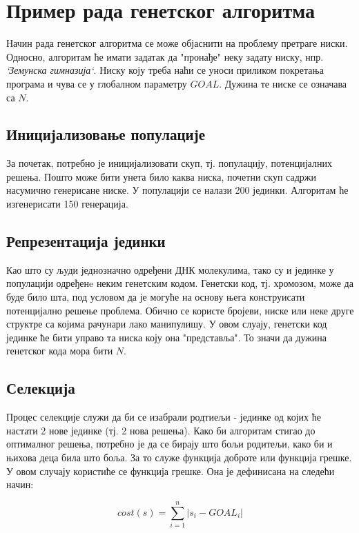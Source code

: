 \documentclass{article}
\begin{document}
\section{Пример рада генетског алгоритма}

Начин рада генетског алгоритма се може објаснити на проблему претраге ниски. Односно,
алгоритам ће имати задатак да "пронађе" неку задату ниску, нпр. \textit{`Земунска гимназија`}.
Ниску коју треба наћи се уноси приликом покретања програма и чува се у глобалном
параметру $GOAL$. Дужина те ниске се означава са $N$.

\subsection{Иницијализовање популације}
За почетак, потребно је иницијализовати скуп, тј. популацију, потенцијалних решења.
Пошто може бити унета било каква ниска, почетни скуп садржи насумично генерисане ниске.
У популацији се налази 200 јединки. Алгоритам ће изгенерисати 150 генерација. 

\subsection{Репрезентација јединки}
Као што су људи једнозначно одређени ДНК молекулима, тако су и јединке у популацији
одређенe неким генетским кодом. Генетски код, тј. хромозом, може да буде било шта, под условом да
је могуће на основу њега конструисати потенцијално решење проблема. Обично се користе бројеви, ниске или неке друге 
структре са којима рачунари лако манипулишу. У овом слуају, генетски код јединке
ће бити управо та ниска коју она "представља". То значи да дужина генетског кода мора бити $N$.

\subsection{Селекција}
Процес селекције служи да би се изабрали родтиељи - јединке од којих ће настати 2 нове 
јединке (тј. 2 нова решења). Како би алгоритам стигао до оптималног решења, потребно 
је да се бирају што бољи родитељи, како би и њихова деца била што боља. За то служе функција доброте или функција грешке.
У овом случају користиће се функција грешке. Она је дефинисана на следећи начин: 

\begin{equation*}
    cost(s)=\sum_{i=1}^{n} |s_i - GOAL_i| 
\end{equation*}
\end{document}
